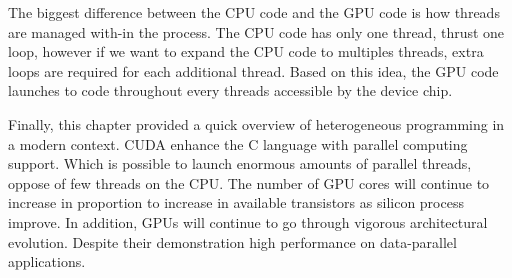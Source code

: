The biggest difference between the CPU code and the GPU code is how threads are managed with-in the process. The CPU code has only one thread, thrust one loop, however if we want to expand the CPU code to multiples threads, extra loops are required for each additional thread. Based on this idea, the GPU code launches to code throughout every threads accessible by the device chip. 

\vspace{3.2em}

Finally, this chapter provided a quick overview of heterogeneous programming in a modern context. CUDA  enhance the C language with parallel computing support. Which is possible to launch  enormous amounts of parallel threads, oppose of few threads on the CPU. The number of GPU cores will continue to increase in proportion to increase in available transistors as silicon process improve. In addition, GPUs will continue to go through vigorous architectural evolution. Despite their demonstration high performance on data-parallel applications. \cite{hwu}








